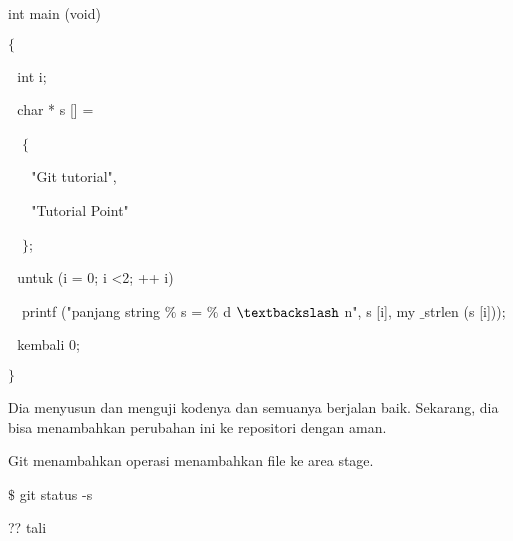\vspace{12pt}
\noindent 
 \hspace*{0.5in} int main (void) \par
\noindent 
 \hspace*{0.5in}  $  \{  $ \par
\noindent 
 \hspace*{0.5in}  $  $ $  $ $  $int i; \par
\noindent 
 \hspace*{0.5in}  $  $ $  $ $  $char * s [] = \par
\noindent 
 \hspace*{0.5in}  $  $ $  $ $  $ $  \{  $ \par
\noindent 
 \hspace*{0.5in}  $  $ $  $ $  $ $  $ $  $ $  $"Git tutorial", \par
\noindent 
 \hspace*{0.5in}  $  $ $  $ $  $ $  $ $  $ $  $"Tutorial Point" \par
\noindent 
 \hspace*{0.5in}  $  $ $  $ $  $ $  \}  $; \par
\vspace{12pt}
\noindent 
 \hspace*{0.5in}  $  $ $  $ $  $untuk (i = 0; i <2; ++ i) $  $ $  $ $  $ $  $ $  $ $  $ \par
\noindent 
 $  $ $  $ $  $ \hspace*{0.5in} printf ("panjang string $  \%  $ s = $  \%  $ d  $  \textbackslash  $ n", s [i], my $  \_  $strlen (s [i])); \par
\vspace{12pt}
\noindent 
 \hspace*{0.5in}  $  $ $  $ $  $kembali 0; \par
\noindent 
 \hspace*{0.5in}  $  \}  $ \par
\vspace{12pt}
\noindent 
Dia menyusun dan menguji kodenya dan semuanya berjalan baik. Sekarang, dia bisa menambahkan perubahan ini ke repositori dengan aman. \par
\vspace{12pt}
\noindent 
Git menambahkan operasi menambahkan file ke area stage. \par
\vspace{12pt}
  $  \$  $ git status -s \par
\noindent 
?? tali \par
